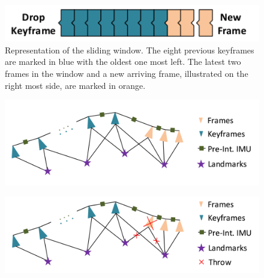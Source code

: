\begin{figure}[h!]
  \centering
      \includegraphics[width=1\textwidth]{images/slideWindow.png}
  \caption{Representation of the sliding window. The eight previous keyframes 
are marked in blue with the oldest one most left. The latest two frames in the 
window and a new arriving frame, illustrated on the right most side, are marked 
in orange.}
  \label{fig:slideWindow}
\end{figure}

\begin{figure}[h!]
\begin{minipage}[b]{1\linewidth}
\centering\large 
  \includegraphics[width=1\textwidth]{images/throw_1.png}
\label{fig:slideWindowGraph_a}

\centering\large 
  \includegraphics[width=1\textwidth]{images/throw_2.png}
\label{fig:slideWindowGraph_b}


\end{minipage}
\end{figure}
